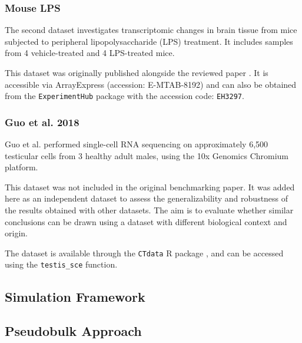 \documentclass[a4paper, 11pt, twocolumn]{article}
\begin{document}
\begin{multicols}{2}
\subsubsection{Mouse LPS}

The second dataset investigates transcriptomic changes in brain tissue from mice subjected to peripheral lipopolysaccharide (LPS) treatment. It includes samples from 4 vehicle-treated and 4 LPS-treated mice.

This dataset was originally published alongside the reviewed paper \citep{muscat}. It is accessible via ArrayExpress (accession: E-MTAB-8192) and can also be obtained from the \texttt{ExperimentHub} package \citep{ExperimentHub} with the accession code: \texttt{EH3297}.

\subsubsection{Guo et al. 2018}

Guo et al. \citep{guo_adult_2018} performed single-cell RNA sequencing on approximately 6,500 testicular cells from 3 healthy adult males, using the 10x Genomics Chromium platform.

This dataset was not included in the original benchmarking paper. It was added here as an independent dataset to assess the generalizability and robustness of the results obtained with other datasets. The aim is to evaluate whether similar conclusions can be drawn using a dataset with different biological context and origin.

The dataset is available through the \texttt{CTdata} R package \citep{CTdata}, and can be accessed using the \texttt{testis\_sce} function.


\subsection{Simulation Framework}

\subsection{Pseudobulk Approach}


\end{multicols}
\end{document}
